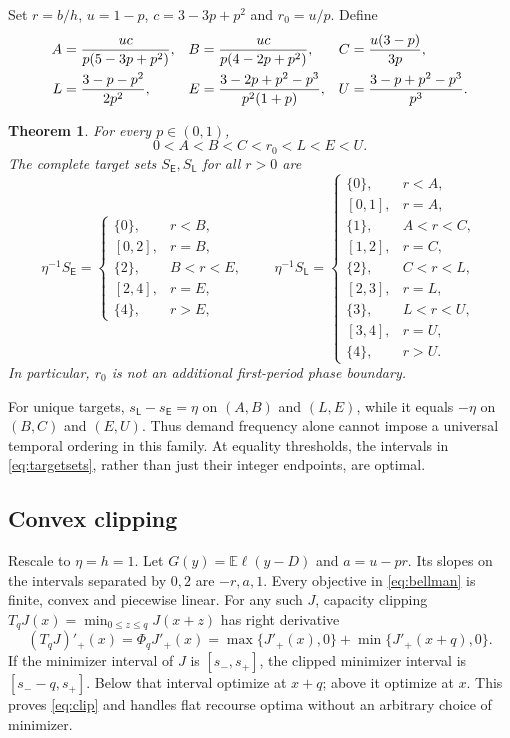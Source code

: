 \documentclass[11pt]{article}
\newtheorem{theorem}{Theorem}[section]
\theoremstyle{remark}\newtheorem{remark}[theorem]{Remark}
\newcommand{\EE}{\mathbb E}
\newcommand{\Ecase}{\mathsf E}
\newcommand{\Lcase}{\mathsf L}
\begin{document}
Set $r=b/h$, $u=1-p$, $c=3-3p+p^2$ and $r_0=u/p$. Define
\begin{align}\label{eq:thresholds}
 A&=\frac{uc}{p(5-3p+p^2)},&
 B&=\frac{uc}{p(4-2p+p^2)},&
 C&=\frac{u(3-p)}{3p},\notag\\
 L&=\frac{3-p-p^2}{2p^2},&
 E&=\frac{3-2p+p^2-p^3}{p^2(1+p)},&
 U&=\frac{3-p+p^2-p^3}{p^3}.
\end{align}

\begin{theorem}\label{thm:phase}
For every $p\in(0,1)$,
\[
 0<A<B<C<r_0<L<E<U.
\]
The complete target sets $S_{\Ecase},S_{\Lcase}$ for all $r>0$ are
\begin{equation}\label{eq:targetsets}
 \eta^{-1}S_{\Ecase}=
 \begin{cases}
 \{0\},&r<B,\\
 [0,2],&r=B,\\
 \{2\},&B<r<E,\\
 [2,4],&r=E,\\
 \{4\},&r>E,
 \end{cases}
\qquad
 \eta^{-1}S_{\Lcase}=
 \begin{cases}
 \{0\},&r<A,\\
 [0,1],&r=A,\\
 \{1\},&A<r<C,\\
 [1,2],&r=C,\\
 \{2\},&C<r<L,\\
 [2,3],&r=L,\\
 \{3\},&L<r<U,\\
 [3,4],&r=U,\\
 \{4\},&r>U.
 \end{cases}
\end{equation}
In particular, $r_0$ is not an additional first-period phase boundary.
\end{theorem}

For unique targets, $s_{\Lcase}-s_{\Ecase}=\eta$ on $(A,B)$ and
$(L,E)$, while it equals $-\eta$ on $(B,C)$ and $(E,U)$.
Thus demand frequency alone cannot impose a universal temporal ordering
in this family. At equality thresholds, the intervals in
\eqref{eq:targetsets}, rather than just their integer
endpoints, are optimal.

\subsection{Convex clipping}
Rescale to $\eta=h=1$. Let $G(y)=\EE\ell(y-D)$ and
$a=u-pr$. Its slopes on the intervals separated by $0,2$ are $-r,a,1$.
Every objective in \eqref{eq:bellman} is finite, convex and piecewise
linear. For any such $J$, capacity clipping
$T_qJ(x)=\min_{0\le z\le q}J(x+z)$ has right derivative
\begin{equation}\label{eq:clip}
 (T_qJ)'_+(x)=\Phi_qJ'_+(x)
 =\max\{J'_+(x),0\}+\min\{J'_+(x+q),0\}.
\end{equation}
If the minimizer interval of $J$ is $[s_-,s_+]$, the clipped minimizer
interval is $[s_--q,s_+]$. Below that interval optimize at $x+q$;
above it optimize at $x$. This proves \eqref{eq:clip} and handles flat
recourse optima without an arbitrary choice of minimizer.
\end{document}
